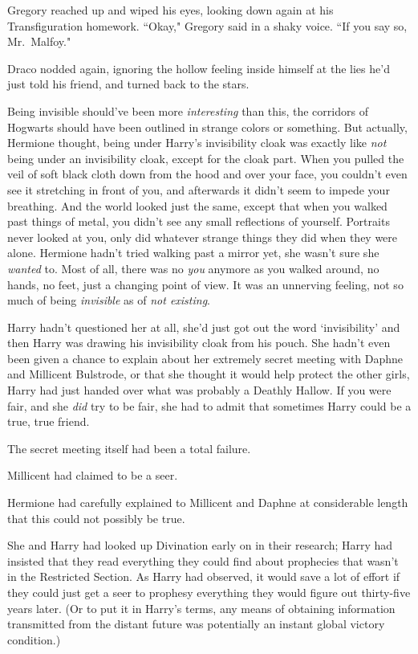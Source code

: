 Gregory reached up and wiped his eyes, looking down again at his Transfiguration homework. ``Okay," Gregory said in a shaky voice. ``If you say so, Mr.~Malfoy."

Draco nodded again, ignoring the hollow feeling inside himself at the lies he'd just told his friend, and turned back to the stars.


Being invisible should've been more \emph{interesting} than this, the corridors of Hogwarts should have been outlined in strange colors or something. But actually, Hermione thought, being under Harry's invisibility cloak was exactly like \emph{not} being under an invisibility cloak, except for the cloak part. When you pulled the veil of soft black cloth down from the hood and over your face, you couldn't even see it stretching in front of you, and afterwards it didn't seem to impede your breathing. And the world looked just the same, except that when you walked past things of metal, you didn't see any small reflections of yourself. Portraits never looked at you, only did whatever strange things they did when they were alone. Hermione hadn't tried walking past a mirror yet, she wasn't sure she \emph{wanted} to. Most of all, there was no \emph{you} anymore as you walked around, no hands, no feet, just a changing point of view. It was an unnerving feeling, not so much of being \emph{invisible} as of \emph{not existing}.

Harry hadn't questioned her at all, she'd just got out the word `invisibility' and then Harry was drawing his invisibility cloak from his pouch. She hadn't even been given a chance to explain about her extremely secret meeting with Daphne and Millicent Bulstrode, or that she thought it would help protect the other girls, Harry had just handed over what was probably a Deathly Hallow. If you were fair, and she \emph{did} try to be fair, she had to admit that sometimes Harry could be a true, true friend.

The secret meeting itself had been a total failure.

Millicent had claimed to be a seer.

Hermione had carefully explained to Millicent and Daphne at considerable length that this could not possibly be true.

She and Harry had looked up Divination early on in their research; Harry had insisted that they read everything they could find about prophecies that wasn't in the Restricted Section. As Harry had observed, it would save a lot of effort if they could just get a seer to prophesy everything they would figure out thirty-five years later. (Or to put it in Harry's terms, any means of obtaining information transmitted from the distant future was potentially an instant global victory condition.)

